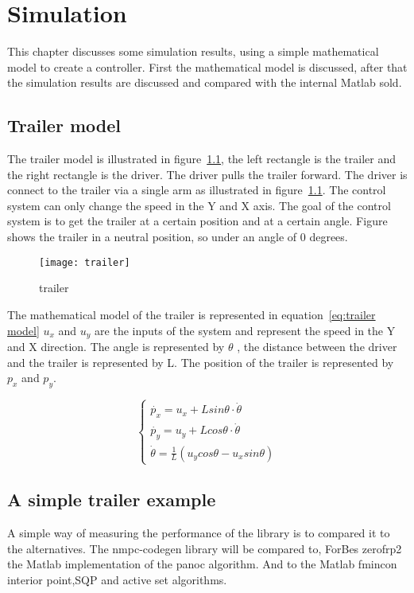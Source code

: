 \chapter{Simulation}
This chapter discusses some simulation results, using a simple mathematical model to create a controller. First the mathematical model is discussed, after that the simulation results are discussed and compared with the internal Matlab sold.

\section{Trailer model}
The trailer model is illustrated in figure~\ref{fig:trailer model}, the left rectangle is the trailer and the right rectangle is the driver. The driver pulls the trailer forward. The driver is connect to the trailer via a single arm as illustrated in figure~\ref{fig:trailer model}. The control system can only change the speed in the Y and X axis. The goal of the control system is to get the trailer at a certain position and at a certain angle. Figure shows the trailer in a neutral position, so under an angle of 0 degrees.

\begin{figure}
	\centering
	\texttt{[image: trailer]}
	\caption{trailer}
	\label{fig:trailer model}
\end{figure}

The mathematical model of the trailer is represented in equation~\ref{eq:trailer model} $u_x$ and $u_y$ are the inputs of the system and represent the speed in the Y and X direction. The angle is represented by $\theta$ , the distance between the driver and the trailer is represented by L. The position of the trailer is represented by $p_x$ and $p_y$.

\begin{equation}
	\begin{cases}
		\dot{p_x} = u_x + L sin \theta \cdot \dot{\theta} \\
		\dot{p_y} = u_y + L cos \theta \cdot \dot{\theta} \\
		\dot{\theta} = \frac{1}{L}(u_ycos \theta - u_x sin \theta)	
	\end{cases}
	\label{eq:trailer model}
\end{equation}

\section{A simple trailer example}
A simple way of measuring the performance of the library is to compared it to the alternatives. The nmpc-codegen library will be compared to, ForBes zerofrp2 the Matlab implementation of the panoc algorithm. And to the Matlab fmincon interior point,SQP and active set algorithms.

